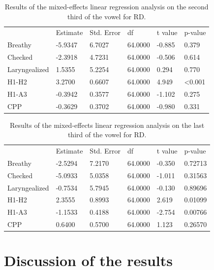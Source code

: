 \documentclass[12pt, letterpaper]{article}
\providecommand{\lsptoprule}{\midrule\toprule}
\providecommand{\lspbottomrule}{\bottomrule\midrule}
\begin{document}
\begin{table}[!h]
	\centering
	\caption{Results of the mixed-effects linear regression analysis on the second third of the vowel for RD. }
	\label{tab:RDSecond}
	 \begin{tabular}{llllll}
	  \lsptoprule
						&  Estimate  & Std. Error & df & t value & p-value \\
	  	Breathy   		& -5.9347  &   6.7027 & 64.0000  &-0.885   & 0.379\\
		Checked    		& -2.3918   &  4.7231 & 64.0000  &-0.506  &  0.614 \\
		Laryngealized	& 1.5355    & 5.2254 & 64.0000   &0.294  &  0.770  \\
		H1-H2			&  3.2700   &  0.6607 & 64.0000  & 4.949	& <0.001\\
		H1-A3			& -0.3942   &  0.3577 & 64.0000  &-1.102   & 0.275 \\
		CPP				& -0.3629   &  0.3702 & 64.0000  &-0.980  &  0.331 \\
	  \lspbottomrule
	 \end{tabular}
\end{table}

\begin{table}[!h]
	\centering
	\caption{Results of the mixed-effects linear regression analysis on the last third of the vowel for RD. }
	\label{tab:RDThird}
	 \begin{tabular}{llllll}
	  \lsptoprule
						&  Estimate  & Std. Error & df & t value & p-value \\
	  	Breathy   		& -2.5294   &  7.2170 & 64.0000 & -0.350 & 0.72713    \\
		Checked    		& -5.0933   &  5.0358 & 64.0000 & -1.011 & 0.31563  \\
		Laryngealized	& -0.7534   &  5.7945 & 64.0000 & -0.130 & 0.89696 \\
		H1-H2			& 2.3555    & 0.8993  &64.0000  & 2.619 & 0.01099 \\
		H1-A3			& -1.1533   &  0.4188 & 64.0000 & -2.754 & 0.00766 \\
		CPP				& 0.6400    & 0.5700 & 64.0000  & 1.123 & 0.26570 \\
	  \lspbottomrule
	 \end{tabular}
\end{table}

\section{Discussion of the results} \label{sec:Discussion}
\end{document}

